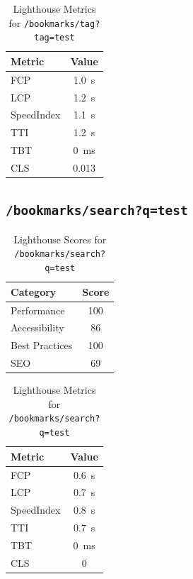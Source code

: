 \begin{table}[H]
  \centering
  \caption{Lighthouse Metrics for \texttt{/bookmarks/tag?tag=test}}
  \begin{tabular}{|l|c|}
    \hline
    Metric & Value \\ \hline
    FCP & 1.0 s \\ \hline
    LCP & 1.2 s \\ \hline
    SpeedIndex & 1.1 s \\ \hline
    TTI & 1.2 s \\ \hline
    TBT & 0 ms \\ \hline
    CLS & 0.013 \\ \hline
  \end{tabular}
\end{table}
\subsection{\texttt{/bookmarks/search?q=test}}

\begin{table}[H]
  \centering
  \caption{Lighthouse Scores for \texttt{/bookmarks/search?q=test}}
  \begin{tabular}{|l|c|}
    \hline
    Category & Score \\ \hline
    Performance & 100 \\ \hline
    Accessibility & 86 \\ \hline
    Best Practices & 100 \\ \hline
    SEO & 69 \\ \hline
  \end{tabular}
\end{table}

\begin{table}[H]
  \centering
  \caption{Lighthouse Metrics for \texttt{/bookmarks/search?q=test}}
  \begin{tabular}{|l|c|}
    \hline
    Metric & Value \\ \hline
    FCP & 0.6 s \\ \hline
    LCP & 0.7 s \\ \hline
    SpeedIndex & 0.8 s \\ \hline
    TTI & 0.7 s \\ \hline
    TBT & 0 ms \\ \hline
    CLS & 0 \\ \hline
  \end{tabular}
\end{table}
